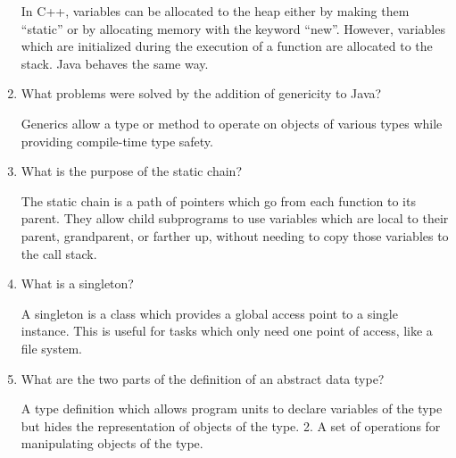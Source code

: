 \begin{enumerate}
    In C++, variables can be allocated to the heap either by making them “static” or by allocating memory with the keyword “new”. However, variables which are initialized during the execution of a function are allocated to the stack. Java behaves the same way.

  \item What problems were solved by the addition
    of genericity to Java?
    
    Generics allow a type or method to operate on objects of various types while providing compile-time type safety.

  \item What is the purpose of the static chain?
  
  The static chain is a path of pointers which go from each function to its parent. They allow child subprograms to use variables which are local to their parent, grandparent, or farther up, without needing to copy those variables to the call stack.

  \item What is a singleton?
  
  A singleton is a class which provides a global access point to a single instance. This is useful for tasks which only need one point of access, like a file system.

  \item What are the two parts of the definition 
    of an abstract data type?

A type definition which allows program units to declare variables of the type but hides the representation of objects of the type. 2. A set of operations for manipulating objects of the type.

  \end{enumerate}


